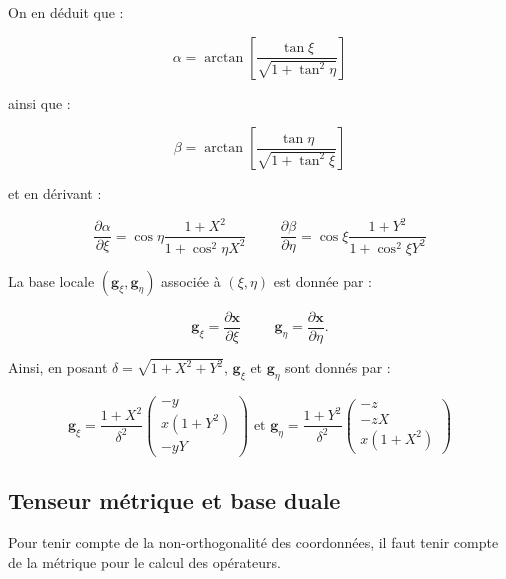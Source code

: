 On en déduit que :

\begin{equation}
\alpha = \arctan \left[ \dfrac{\tan \xi}{\sqrt{1 + \tan^2 \eta}} \right]
\end{equation}

ainsi que :

\begin{equation}
\beta = \arctan \left[ \dfrac{\tan \eta}{\sqrt{1 + \tan^2 \xi}} \right]
\end{equation}

et en dérivant :

\begin{equation}
\dfrac{\partial \alpha}{\partial \xi} = \cos \eta \dfrac{1+X^2}{1+\cos^2 \eta X^2} \hspace{1cm} \dfrac{\partial \beta}{\partial \eta} = \cos \xi \dfrac{1+Y^2}{1+\cos^2 \xi Y^2}
\end{equation}

La base locale $(\mathbf{g}_{\xi}, \mathbf{g}_{\eta})$ associée à $(\xi,\eta)$ est donnée par :

$$\mathbf{g}_{\xi} = \dfrac{\partial \mathbf{x}}{\partial \xi} \hspace{1cm} \mathbf{g}_{\eta} = \dfrac{\partial \mathbf{x}}{\partial \eta}.$$

Ainsi, en posant $\delta = \sqrt{1+X^2+Y^2}$, $\mathbf{g}_{\xi}$ et $\mathbf{g}_{\eta}$ sont donnés par :

\begin{equation}
\mathbf{g}_{\xi} = \dfrac{1+X^2}{\delta^2} \begin{pmatrix}
-y \\ x(1+Y^2) \\ -yY
\end{pmatrix} \text{ et } \mathbf{g}_{\eta} = \dfrac{1+Y^2}{\delta^2} \begin{pmatrix}
-z \\ -zX \\ x(1+X^2)
\end{pmatrix}
\label{base locale}
\end{equation}

\subsection{Tenseur métrique et base duale}

Pour tenir compte de la non-orthogonalité des coordonnées, il faut tenir compte de la métrique pour le calcul des opérateurs.

